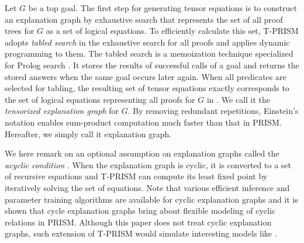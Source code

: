 \documentclass[a4paper]{report}
\begin{document}
Let $G$ be a top goal.  The first step for generating tensor equations
is  to  construct  an  explanation graph  by  exhaustive  search  that
represents the  set of  all proof trees  for $G$ as  a set  of logical
equations.  To efficiently  calculate  this set,  T-PRISM adopts  {\em
	tabled search\/} in  the exhaustive search for all  proofs and applies
dynamic  programming  to them.  The  tabled  search is  a  memoization
technique specialized for Prolog  search \cite{Zhou08}.  It stores the
results of successful  calls of a goal and returns  the stored answers
when  the same  goal  occurs  later again.   When  all predicates  are
selected for  tabling, the resulting  set of tensor  equations exactly
corresponds to  the set of  logical equations representing  all proofs
for $G$ in .  We  call it the {\em tensorized
	explanation  graph\/} for  $G$.   By  removing redundant  repetitions,
Einstein's notation  enables sum-product computation much  faster than
that in PRISM.  Hereafter, we simply call it explanation graph.

We here remark on an  optional assumption on explanation graphs called
the {\it  acyclic condition\/}  \cite{Sato08a}.  When  the explanation
graph is cyclic,  it is converted to a set  of recursive equations and
T-PRISM can compute  its least fixed point by  iteratively solving the
set of equations.  Note that various efficient inference and parameter
training   algorithms    are   available   for    cyclic   explanation
graphs \cite{sato2014infinite,kojimaprefix} and it is shown that cycle
explanation   graphs  bring   about   flexible   modeling  of   cyclic
relations \cite{kojima2015goal} in PRISM.
Although this  paper does  not treat  cyclic explanation  graphs, such
extension    of   T-PRISM    would    simulate   interesting    models
like \cite{sato2017linear}.


\end{document}
